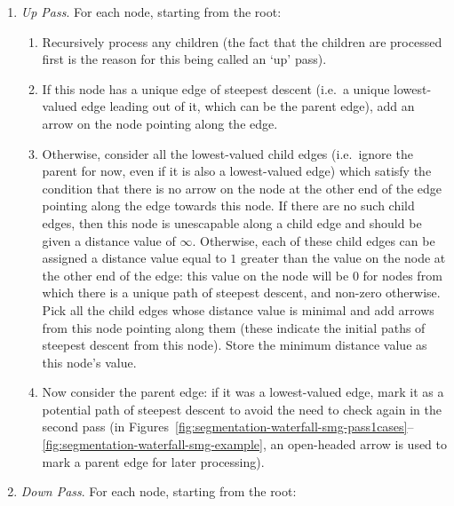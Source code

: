 \begin{enumerate}

\item \emph{Up Pass}. For each node, starting from the root:

\begin{enumerate}

\item Recursively process any children (the fact that the children are processed first is the reason for this being called an `up' pass).

\item If this node has a unique edge of steepest descent (i.e.~a unique lowest-valued edge leading out of it, which can be the parent edge), add an arrow on the node pointing along the edge.

\item Otherwise, consider all the lowest-valued child edges (i.e.~ignore the parent for now, even if it is also a lowest-valued edge) which satisfy the condition that there is no arrow on the node at the other end of the edge pointing along the edge towards this node. If there are no such child edges, then this node is unescapable along a child edge and should be given a distance value of $\infty$. Otherwise, each of these child edges can be assigned a distance value equal to $1$ greater than the value on the node at the other end of the edge: this value on the node will be $0$ for nodes from which there is a unique path of steepest descent, and non-zero otherwise. Pick all the child edges whose distance value is minimal and add arrows from this node pointing along them (these indicate the initial paths of steepest descent from this node). Store the minimum distance value as this node's value.

\item Now consider the parent edge: if it was a lowest-valued edge, mark it as a potential path of steepest descent to avoid the need to check again in the second pass (in Figures~\ref{fig:segmentation-waterfall-smg-pass1cases}--\ref{fig:segmentation-waterfall-smg-example}, an open-headed arrow is used to mark a parent edge for later processing).

\end{enumerate}

\item \emph{Down Pass}. For each node, starting from the root:

\begin{enumerate}


\end{enumerate}
\end{enumerate}
